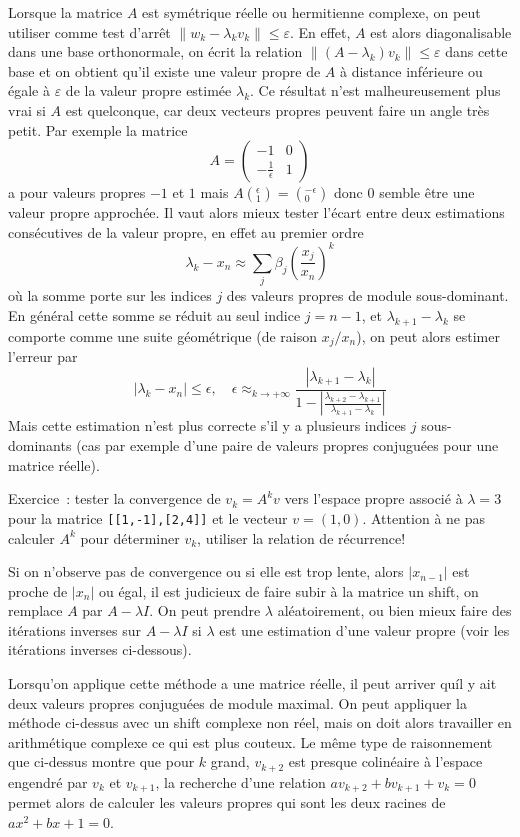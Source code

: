 \documentclass[a4paper,11pt]{article}
\begin{document}
\begin{giacjshere}
Lorsque la matrice $A$ est sym\'etrique r\'eelle ou hermitienne
complexe, on peut utiliser comme
test d'arr\^et $\| w_k-\lambda_k v_k\| \leq \varepsilon $. En effet,
$A$ est alors diagonalisable dans une base orthonormale,
on \'ecrit la relation $\| (A-\lambda_k)v_k \| \leq \varepsilon$
dans cette base et on obtient qu'il existe une valeur propre de $A$
\`a distance inf\'erieure ou \'egale \`a $\varepsilon$ de
la valeur propre estim\'ee $\lambda_k$. Ce r\'esultat n'est
malheureusement plus vrai si $A$ est quelconque, car deux
vecteurs propres peuvent faire un angle tr\`es petit. Par
exemple la matrice 
$$ A=\left(\begin{array}{cc} 
-1 & 0\\
-\frac1\epsilon& 1
\end{array}\right)$$
a pour valeurs propres $-1$ et $1$ mais
$A\left(^\epsilon_1\right)=\left(^{-\epsilon}_0\right)$ donc 0 semble
\^etre une valeur propre approch\'ee. Il vaut alors mieux tester
l'\'ecart entre deux estimations cons\'ecutives de la valeur
propre, en effet au premier ordre
$$ \lambda_k-x_n \approx \sum_j \beta_j \left( \frac{x_j}{x_n}\right)^k$$
o\`u la somme porte sur les indices $j$ des valeurs propres
de module sous-dominant. En g\'en\'eral cette somme se
r\'eduit au seul indice $j=n-1$, et $\lambda_{k+1}-\lambda_k$ se
comporte comme une suite g\'eom\'etrique (de raison $x_j/x_n$),
on peut alors estimer l'erreur par 
$$ |\lambda_k-x_n| \leq \epsilon, \quad
\epsilon \approx_{k \rightarrow +\infty} \frac{|\lambda_{k+1}-\lambda_k|}
{1-|\frac{\lambda_{k+2}-\lambda_{k+1}}{\lambda_{k+1}-\lambda_k}|}
$$
Mais cette estimation n'est plus correcte s'il y a plusieurs indices
$j$ sous-dominants (cas par exemple d'une paire 
de valeurs propres conjugu\'ees
pour une matrice r\'eelle).

Exercice~: tester la convergence de $v_k=A^kv$ vers l'espace propre
associé à $\lambda=3$ pour la matrice \verb|[[1,-1],[2,4]]|
et le vecteur $v=(1,0)$. Attention à ne pas calculer $A^k$ pour
déterminer $v_k$, utiliser la relation de récurrence!

Si on n'observe pas de convergence ou si elle est trop lente, alors
$|x_{n-1}|$ est proche de $|x_n|$ ou égal, il est judicieux
de faire subir à la matrice un shift, on remplace $A$ par
$A-\lambda I$. On peut prendre $\lambda$ aléatoirement, ou bien
mieux faire des itérations inverses sur $A-\lambda I$ si $\lambda$
est une estimation d'une valeur propre (voir les itérations inverses
ci-dessous).

Lorsqu'on applique cette méthode a une matrice réelle, il peut arriver
quíl y ait deux valeurs propres conjuguées de module maximal. On
peut appliquer la méthode ci-dessus avec un shift complexe non réel,
mais on doit alors travailler en arithmétique complexe 
ce qui est plus couteux. Le même
type de raisonnement que ci-dessus montre que pour $k$ grand,
$v_{k+2}$ est presque colinéaire à l'espace engendré par $v_k$ et $v_{k+1}$, 
la recherche d'une relation $ av_{k+2}+ b v_{k+1} + v_k=0$ 
permet alors de calculer les valeurs propres qui sont les deux racines
de $ax^2+bx+1=0$.


\end{giacjshere}
\end{document}
